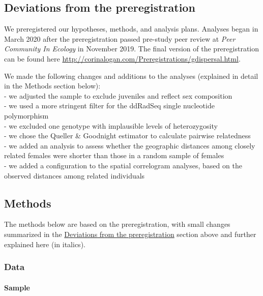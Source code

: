 \documentclass[
]{article}
\begin{document}
\hypertarget{deviations-from-the-preregistration}{%
\subsection{Deviations from the
preregistration}\label{deviations-from-the-preregistration}}

We preregistered our hypotheses, methods, and analysis plans. Analyses
began in March 2020 after the preregistration passed pre-study peer
review at \emph{Peer Community In Ecology} in November 2019. The final
version of the preregistration can be found here
\url{http://corinalogan.com/Preregistrations/gdispersal.html}.

We made the following changes and additions to the analyses (explained
in detail in the Methods section below):\\
- we adjusted the sample to exclude juveniles and reflect sex
composition\\
- we used a more stringent filter for the ddRadSeq single nucleotide
polymorphism\\
- we excluded one genotype with implausible levels of heterozygosity\\
- we chose the Queller \& Goodnight estimator to calculate pairwise
relatedness\\
- we added an analysis to assess whether the geographic distances among
closely related females were shorter than those in a random sample of
females\\
- we added a configuration to the spatial correlogram analyses, based on
the observed distances among related individuals

\newpage

\hypertarget{methods}{%
\subsection{Methods}\label{methods}}

The methods below are based on the preregistration, with small changes
summarized in the
\protect\hyperlink{deviations-from-the-preregistration}{Deviations from
the preregistration} section above and further explained here (in
italics).

\hypertarget{data}{%
\subsubsection{Data}\label{data}}

\hypertarget{sample}{%
\paragraph{Sample}\label{sample}}
\end{document}
